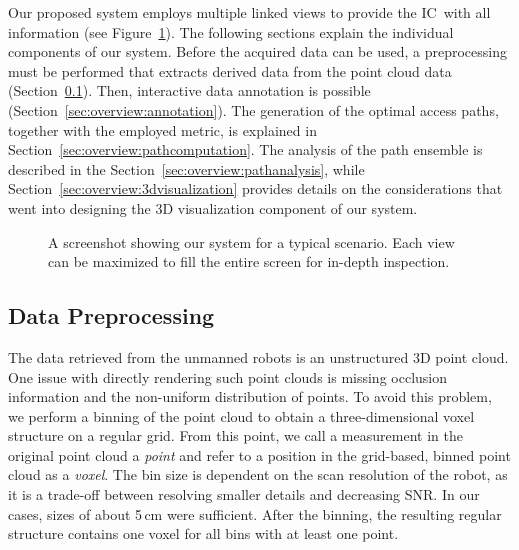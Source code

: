 \documentclass[conference,10pt,letter]{IEEEtran}
\def\IC{IC}
\begin{document}

Our proposed system employs multiple linked views to provide the \IC\ with all information (see Figure~\ref{sec:overview:system}). The following sections explain the individual components of our system. Before the acquired data can be used, a preprocessing must be performed that extracts derived data from the point cloud data (Section~\ref{sec:overview:preprocessing}). Then, interactive data annotation is possible (Section~\ref{sec:overview:annotation}). The generation of the optimal access paths, together with the employed metric, is explained in Section~\ref{sec:overview:pathcomputation}. The analysis of the path ensemble is described in the Section~\ref{sec:overview:pathanalysis}, while Section~\ref{sec:overview:3dvisualization} provides details on the considerations that went into designing the 3D visualization component of our system.

\begin{figure}
    \centering
    \caption{A screenshot showing our system for a typical scenario. Each view can be maximized to fill the entire screen for in-depth inspection.}
    \label{sec:overview:system}
\end{figure}


\subsection{Data Preprocessing} \label{sec:overview:preprocessing}
The data retrieved from the unmanned robots is an unstructured 3D point cloud. One issue with directly rendering such point clouds is missing occlusion information and the non-uniform distribution of points. To avoid this problem, we perform a binning of the point cloud to obtain a three-dimensional voxel structure on a regular grid. From this point, we call a measurement in the original point cloud a \emph{point} and refer to a position in the grid-based, binned point cloud as a \emph{voxel}. The bin size is dependent on the scan resolution of the robot, as it is a trade-off between resolving smaller details and decreasing SNR. In our cases, sizes of about 5\,cm were sufficient. After the binning, the resulting regular structure contains one voxel for all bins with at least one point.
\end{document}
